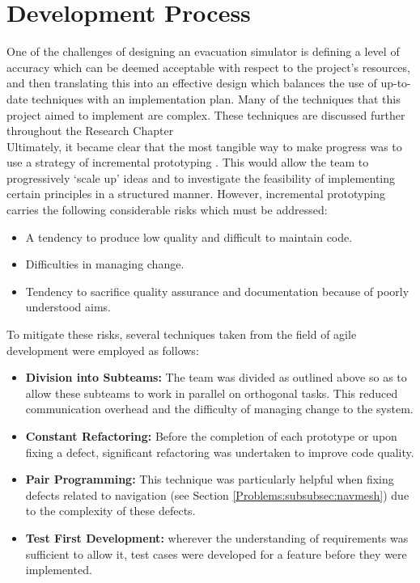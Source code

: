 \section{Development Process}
\label{Team:subsec:process}
One of the challenges of designing an evacuation simulator is defining a level of accuracy which can be deemed acceptable with respect to the project's resources, and then translating this into an effective design which balances the use of up-to-date techniques with an implementation plan. Many of the techniques that this project aimed to implement are complex. These techniques are discussed further throughout the Research Chapter\\
Ultimately, it became clear that the most tangible way to make progress was to use a strategy of incremental prototyping \cite[Ch 2.3.2]{SommervilleSoftwareEng}. This would allow the team to progressively `scale up' ideas and to investigate the feasibility of implementing certain principles in a structured manner. However, incremental prototyping carries the following considerable risks which must be addressed:
\begin{itemize}
\item A tendency to produce low quality and difficult to maintain code.
\item Difficulties in managing change.
\item Tendency to sacrifice quality assurance and documentation because of poorly understood aims.
\end{itemize}

To mitigate these risks, several techniques taken from the field of agile development \cite[Ch. 3]{SommervilleSoftwareEng} were employed as follows:
\begin{itemize}
\item \textbf{Division into Subteams:} The team was divided as outlined above so as to allow these subteams to work in parallel on orthogonal tasks. This reduced communication overhead and the difficulty of managing change to the system.
\item \textbf{Constant Refactoring:} Before the completion of each prototype or upon fixing a defect, significant refactoring was undertaken to improve code quality.
\item \textbf{Pair Programming:} This technique was particularly helpful when fixing defects related to navigation (see Section \ref{Problems:subsubsec:navmesh}) due to the complexity of these defects.
\item \textbf{Test First Development:} wherever the understanding of requirements was sufficient to allow it, test cases were developed for a feature before they were implemented.
\end{itemize}

%
